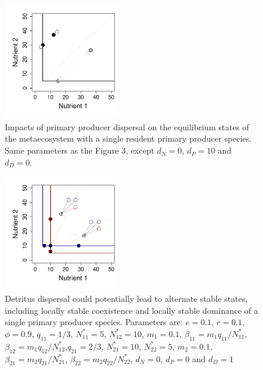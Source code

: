 \documentclass[12pt]{paper}
\begin{document}
\begin{figure}[p]
   \centering
   \includegraphics[width=0.45\textwidth]{ProducerDiffusion.pdf}
   \caption{Impacts of primary producer dispersal on the equilibrium states of the metaecosystem with a single resident primary producer species. Same parameters as the Figure 3, except $d_N = 0$, $d_P = 10$ and $d_D = 0$.}
   \label{f:Producers}
\end{figure}
\newpage

\begin{figure}[p]
   \centering
   \includegraphics[width=0.45\textwidth]{AlternateStates.pdf}
   \caption{Detritus dispersal could potentially lead to alternate stable states, including locally stable coexistence and locally stable dominance of a single primary producer species. Parameters are: $e=0.1$, $r= 0.1$, $\phi=0.9$, $q_{11} = 1/3$, $N^*_{11}=5$, $N^*_{12}=10$, $m_1 =0.1$, $\beta_{11} = m_1q_{11}/N^*_{11}$, $\beta_{12} = m_1q_{12}/N^*_{12}$,$q_{21} = 2/3$, $N^*_{21}=10$, $N^*_{22}=5$, $m_2 =0.1$,$\beta_{21} = m_2q_{21}/N^*_{21}$, $\beta_{22} = m_2q_{22}/N^*_{22}$, $d_N = 0$, $d_P = 0$ and $d_D = 1$}
   \label{f:ASS}
\end{figure}
\newpage
\end{document}
